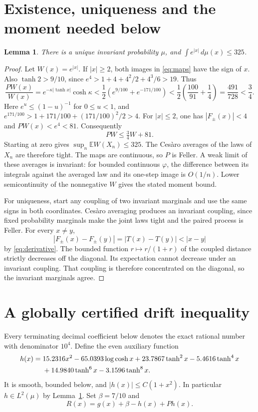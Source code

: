 \documentclass[11pt]{article}
\newtheorem{lemma}[theorem]{Lemma}
\theoremstyle{remark}
\newcommand{\E}{\mathbb E}
\begin{document}
\section{Existence, uniqueness and the moment needed below}
\begin{lemma}\label{lem:moment}
There is a unique invariant probability $\mu$, and $\int e^{|x|}\,d\mu(x)\le325$.
\end{lemma}
\begin{proof}
Let $W(x)=e^{|x|}$. If $|x|\ge2$, both images in \eqref{eq:maps} have the sign of $x$. Also $\tanh2>9/10$, since $e^4>1+4+4^2/2+4^3/6>19$. Thus
\[
\frac{PW(x)}{W(x)}=e^{-\kappa|\tanh x|}\cosh\kappa
<\frac12(e^{9/100}+e^{-171/100})
<\frac12\left(\frac{100}{91}+\frac14\right)
=\frac{491}{728}<\frac34.
\]
Here $e^u\le(1-u)^{-1}$ for $0\le u<1$, and
$e^{171/100}>1+171/100+(171/100)^2/2>4$.
For $|x|\le2$, one has $|F_\pm(x)|<4$ and $PW(x)<e^4<81$. Consequently
\begin{equation}\label{eq:Wdrift}
PW\le\tfrac34W+81.
\end{equation}
Starting at zero gives $\sup_n\E W(X_n)\le325$. The Ces\`aro averages of the laws of $X_n$ are therefore tight. The maps are continuous, so $P$ is Feller. A weak limit of these averages is invariant: for bounded continuous $\varphi$, the difference between its integrals against the averaged law and its one-step image is $O(1/n)$. Lower semicontinuity of the nonnegative $W$ gives the stated moment bound.

For uniqueness, start any coupling of two invariant marginals and use the same signs in both coordinates. Ces\`aro averaging produces an invariant coupling, since fixed probability marginals make the joint laws tight and the paired process is Feller. For every $x\ne y$,
\[
|F_\pm(x)-F_\pm(y)|=|T(x)-T(y)|<|x-y|
\]
by \eqref{eq:derivative}. The bounded function $r\mapsto r/(1+r)$ of the coupled distance strictly decreases off the diagonal. Its expectation cannot decrease under an invariant coupling. That coupling is therefore concentrated on the diagonal, so the invariant marginals agree.
\end{proof}

\section{A globally certified drift inequality}
Every terminating decimal coefficient below denotes the exact rational number with denominator $10^4$. Define the even auxiliary function
\begin{align}\label{eq:h}
h(x)={}&15.2316x^2-65.0393\log\cosh x
       +23.7867\tanh^2x-5.4616\tanh^4x\notag\\
      &+14.9840\tanh^6x-3.1596\tanh^8x.
\end{align}
It is smooth, bounded below, and $|h(x)|\le C(1+x^2)$. In particular $h\in L^2(\mu)$ by Lemma~\ref{lem:moment}. Set $\beta=7/10$ and
\begin{equation}\label{eq:R}
R(x)=g(x)+\beta-h(x)+Ph(x).
\end{equation}
\end{document}
